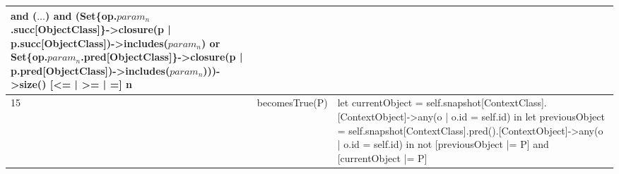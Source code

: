 \begin{longtable}{|>{\footnotesize}p{0.6cm}|>{\scriptsize\raggedright\arraybackslash}p{4cm}|>{\scriptsize\raggedright\arraybackslash}p{\dimexpr\textwidth-4.6cm-4\tabcolsep-3\arrayrulewidth\relax}|}
    and ($\ldots$) 
    and (Set\{op.$param_n$.succ[ObjectClass]\}->closure(p | p.succ[ObjectClass])->includes($param_n$) or Set\{op.$param_n$.pred[ObjectClass]\}->closure(p | p.pred[ObjectClass])->includes($param_n$)))->size() [<= | >= | =] n \\
    \hline
    15 &
    becomesTrue(P) &
    let currentObject = self.snapshot[ContextClass].[ContextObject]->any(o | o.id = self.id) in
    let previousObject = self.snapshot[ContextClass].pred().[ContextObject]->any(o | o.id = self.id) in 
    not [previousObject |= P] and [currentObject |= P] \\
    \hline
\end{longtable}
